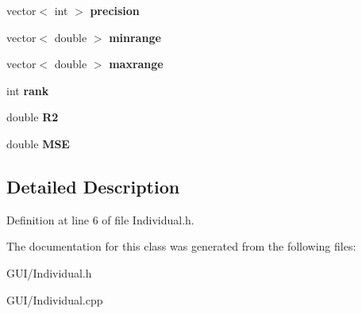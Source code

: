 \begin{DoxyCompactItemize}
\item 
\mbox{\label{class_c_individual_a19ab61d7b829350eee6890e73785bae4}} 
vector$<$ int $>$ {\bfseries precision}
\item 
\mbox{\label{class_c_individual_a57b412457cb7aa5d0703bbaf77de4ff0}} 
vector$<$ double $>$ {\bfseries minrange}
\item 
\mbox{\label{class_c_individual_a81417d08583e11549892f80be0fc5c34}} 
vector$<$ double $>$ {\bfseries maxrange}
\item 
\mbox{\label{class_c_individual_a3654c90e71215259c44679b1af4c8efe}} 
int {\bfseries rank}
\item 
\mbox{\label{class_c_individual_ac0cf7b21bf644793d4e4bfabd99daaf3}} 
double {\bfseries R2}
\item 
\mbox{\label{class_c_individual_a64047e51efadd8e78998c5c9d62fff76}} 
double {\bfseries M\+SE}
\end{DoxyCompactItemize}


\subsection{Detailed Description}


Definition at line 6 of file Individual.\+h.



The documentation for this class was generated from the following files\+:\begin{DoxyCompactItemize}
\item 
G\+U\+I/Individual.\+h\item 
G\+U\+I/Individual.\+cpp\end{DoxyCompactItemize}
